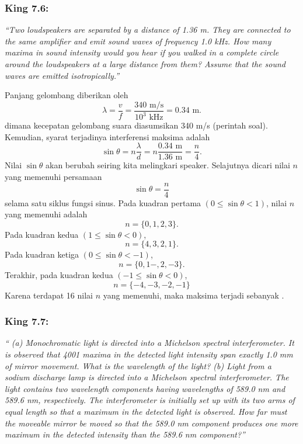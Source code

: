 \documentclass[../../../main.tex]{subfiles}
\begin{document}
\subsubsection*{King 7.6:} \emph{\enquote{Two loudspeakers are separated by a distance of 1.36 m. They are connected to the same ampliﬁer and emit sound waves of frequency 1.0 kHz. How many maxima in sound intensity would you hear if you walked in a complete circle around the loudspeakers at a large distance from them? Assume that the sound waves are emitted isotropically.}}

Panjang gelombang diberikan oleh 
\begin{equation*}
  \lambda=\frac{v}{f}=\frac{340\text{ m/s}}{10^3\text{ kHz}}=0.34 \text{ m}.
\end{equation*}
dimana kecepatan gelombang suara diasumsikan 340 m/s (perintah soal). Kemudian, syarat terjadinya interferensi maksima adalah 
\begin{equation*}
  \sin \theta =n\frac{\lambda}{d}=n\frac{0.34 \text{ m}}{1.36 \text{ m}}=\frac{n}{4}.
\end{equation*}
Nilai $\sin \theta$ akan berubah seiring kita melingkari speaker. Selajutnya dicari nilai $n$ yang memenuhi persamaan
\begin{equation*}
  \sin \theta =\frac{n}{4}
\end{equation*}
selama satu siklus fungsi sinus. Pada kuadran pertama $(0\leq \sin \theta<1)$, nilai $n$ yang memenuhi adalah 
\begin{equation*}
  n=\{0,1,2,3\}.
\end{equation*}
Pada kuadran kedua $(1\leq \sin \theta<0)$,
\begin{equation*}
  n=\{4,3,2,1\}.
\end{equation*}
Pada kuadran ketiga $(0\leq \sin \theta<-1)$,
\begin{equation*}
  n=\{0,1-,2,-3\}.
\end{equation*}
Terakhir, pada kuadran kedua $(-1\leq \sin \theta<0)$,
\begin{equation*}
  n=\{-4,-3,-2,-1\}
\end{equation*}
Karena terdapat 16 nilai $n$ yang memenuhi, maka maksima terjadi sebanyak .
\subsubsection*{King 7.7:} \emph{\enquote{ (a) Monochromatic light is directed into a Michelson spectral interferometer. It is observed that 4001 maxima in the detected light intensity span exactly 1.0 mm of mirror movement. What is the wavelength of the light? (b) Light from a sodium discharge lamp is directed into a Michelson spectral interferometer. The light contains two wavelength components having wavelengths of 589.0 nm and 589.6 nm, respectively. The interferometer is initially set up with its two arms of equal length so that a maximum in the detected light is observed. How far must the moveable mirror be moved so that the 589.0 nm component produces one more maximum in the detected intensity than the 589.6 nm component?}}
\end{document}
